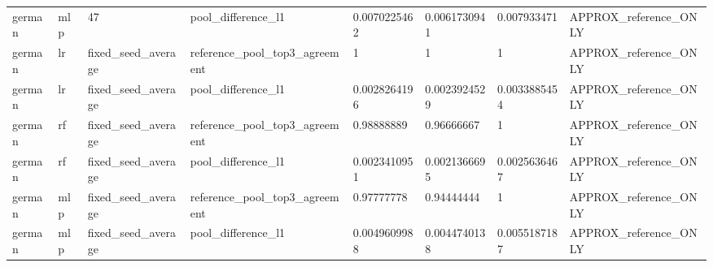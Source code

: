 \begin{tabular}{llllllll}
german & mlp & 47 & pool\_difference\_l1 & 0.0070225462 & 0.0061730941 & 0.007933471 & APPROX\_reference\_ONLY \\
german & lr & fixed\_seed\_average & reference\_pool\_top3\_agreement & 1 & 1 & 1 & APPROX\_reference\_ONLY \\
german & lr & fixed\_seed\_average & pool\_difference\_l1 & 0.0028264196 & 0.0023924529 & 0.0033885454 & APPROX\_reference\_ONLY \\
german & rf & fixed\_seed\_average & reference\_pool\_top3\_agreement & 0.98888889 & 0.96666667 & 1 & APPROX\_reference\_ONLY \\
german & rf & fixed\_seed\_average & pool\_difference\_l1 & 0.0023410951 & 0.0021366695 & 0.0025636467 & APPROX\_reference\_ONLY \\
german & mlp & fixed\_seed\_average & reference\_pool\_top3\_agreement & 0.97777778 & 0.94444444 & 1 & APPROX\_reference\_ONLY \\
german & mlp & fixed\_seed\_average & pool\_difference\_l1 & 0.0049609988 & 0.0044740138 & 0.0055187187 & APPROX\_reference\_ONLY \\
\bottomrule
\end{tabular}
